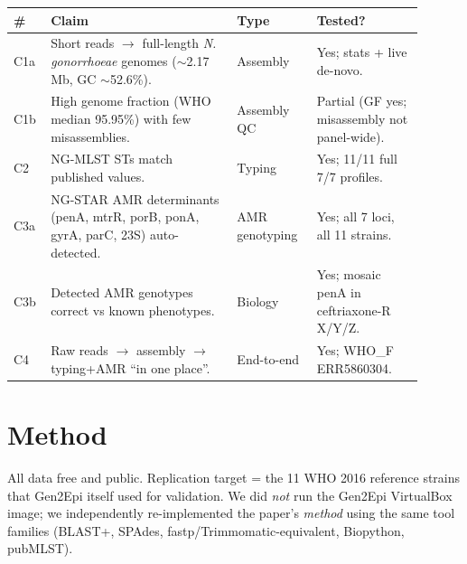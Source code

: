 \documentclass[11pt,letterpaper]{article}
\begin{document}
\begin{longtable}{@{}p{0.06\linewidth}p{0.42\linewidth}p{0.18\linewidth}p{0.24\linewidth}@{}}
\toprule
\textbf{\#} & \textbf{Claim} & \textbf{Type} & \textbf{Tested?} \\
\midrule
\endhead
C1a & Short reads $\rightarrow$ full-length \textit{N. gonorrhoeae} genomes ($\sim$2.17 Mb, GC $\sim$52.6\%). & Assembly & Yes; stats + live de-novo. \\
C1b & High genome fraction (WHO median 95.95\%) with few misassemblies. & Assembly QC & Partial (GF yes; misassembly not panel-wide). \\
C2  & NG-MLST STs match published values. & Typing & Yes; 11/11 full 7/7 profiles. \\
C3a & NG-STAR AMR determinants (penA, mtrR, porB, ponA, gyrA, parC, 23S) auto-detected. & AMR genotyping & Yes; all 7 loci, all 11 strains. \\
C3b & Detected AMR genotypes correct vs known phenotypes. & Biology & Yes; mosaic penA in ceftriaxone-R X/Y/Z. \\
C4  & Raw reads $\rightarrow$ assembly $\rightarrow$ typing+AMR ``in one place''. & End-to-end & Yes; WHO\_F ERR5860304. \\
\bottomrule
\end{longtable}

\section{Method}

All data free and public. Replication target = the 11 WHO 2016 reference strains that Gen2Epi itself used for validation. We did \emph{not} run the Gen2Epi VirtualBox image; we independently re-implemented the paper's \emph{method} using the same tool families (BLAST+, SPAdes, fastp/Trimmomatic-equivalent, Biopython, pubMLST).
\end{document}

